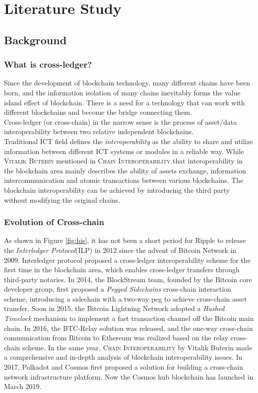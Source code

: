 \chapter{Literature Study} 
\label{chap:2}
\section{Background}

\subsection{What is cross-ledger?}
\noindent Since the development of blockchain technology, many different chains have been born, and the information isolation of many chains inevitably forms the value island effect of blockchain. There is a need for a technology that can work with different blockchains and become the bridge connecting them. \\
\noindent Cross-ledger (or cross-chain) in the narrow sense is the process of asset/data interoperability between two relative independent blockchains.\\
\noindent Traditional ICT field defines the \textit{interoperability} as the ability to share and utilize information between different ICT systems or modules in a reliable way\cite{osello2015bim}. While \textsc{Vitalik Buterin} mentioned in \textsc{Chain Interoperability}\cite{buterin2016chain} that interoperability in the blockchain area mainly describes the ability of assets exchange, information intercommunication and atomic transactions between various blockchains. The blockchain interoperability can be achieved by introducing the third party without modifying the original chains.

\subsection{Evolution of Cross-chain}
\noindent As shown in Figure \ref{fig:his}, it has not been a short period for Ripple to release the \textit{Interledger Protocol}(ILP)\cite{thomas2015protocol} in 2012 since the advent of Bitcoin Network in 2009. Interledger protocol proposed a cross-ledger interoperability scheme for the first time in the blockchain area, which enables cross-ledger transfers through third-party notaries. In 2014, the BlockStream team, founded by the Bitcoin core developer group, first proposed a \textit{Pegged Sidechains} cross-chain interaction scheme, introducing a sidechain with a two-way peg to achieve cross-chain asset transfer. Soon in 2015, the Bitcoin Lightning Network\cite{poon2016bitcoin} adopted a \textit{Hashed Timelock} mechanism to implement a fast transaction channel off the Bitcoin main chain. In 2016, the BTC-Relay\cite{btc-relay} solution was released, and the one-way cross-chain communication from Bitcoin to Ethereum was realized based on the relay cross-chain scheme. In the same year, \textsc{Chain Interoperability}\cite{buterin2016chain} by Vitalik Buterin made a comprehensive and in-depth analysis of blockchain interoperability issues. In 2017, Polkadot and Cosmos first proposed a solution for building a cross-chain network infrastructure platform. Now the Cosmos hub blockchain has launched in March 2019.

